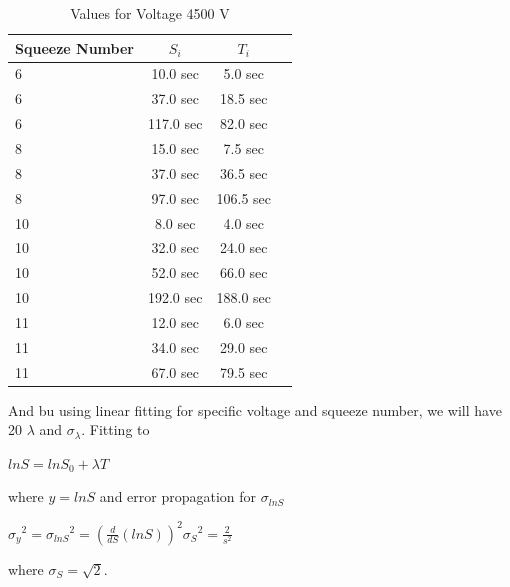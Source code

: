 \documentclass[aps,twocolumn,secnumarabic,nobalancelastpage,amsmath,amssymb,
nofootinbib]{revtex4}
\begin{document}
\begin{center}
\begin{table}[htbp]
\begin{tabular}{|l|c|c|r|}
\hline
{\small Squeeze Number} & { \small ${S}_{i}$} & {\small  ${T}_{i} $ } \\
\hline
6& 10.0 sec & 5.0 sec  \\
6& 37.0 sec & 18.5 sec  \\
6& 117.0 sec & 82.0 sec  \\
8& 15.0 sec & 7.5 sec  \\
8& 37.0 sec & 36.5 sec  \\
8& 97.0 sec & 106.5 sec  \\
10& 8.0 sec & 4.0 sec  \\
10& 32.0 sec & 24.0 sec  \\
10& 52.0 sec & 66.0 sec  \\
10& 192.0 sec & 188.0 sec  \\
11& 12.0 sec & 6.0 sec  \\
11& 34.0 sec & 29.0 sec  \\
11& 67.0 sec & 79.5 sec  \\


\hline
\end{tabular}
\caption{\label{tab:linfitresults} Values for Voltage 4500 V }
\end{table}
\end{center}

And bu using linear fitting  for specific voltage and squeeze number, we will have 20 $\lambda$ and $\sigma_{\lambda}$. Fitting to 

\begin{center}
$lnS=ln{S}_{0}+{\lambda}{T}$
\end{center}

where $y=lnS$ and error propagation for ${\sigma}_{lnS}$

\begin{center}
${ { \sigma  }_{ y } }^{ 2 }={ { \sigma  }_{ lnS } }^{ 2 }={ \left( \frac { d }{ dS } \left( lnS \right)  \right)  }^{ 2 }{ { \sigma  }_{ S } }^{ 2 }=\frac { 2 }{ { s }^{ 2 } } $
\end{center}

where ${\sigma}_{S}=\sqrt{2}$.
\end{document}
